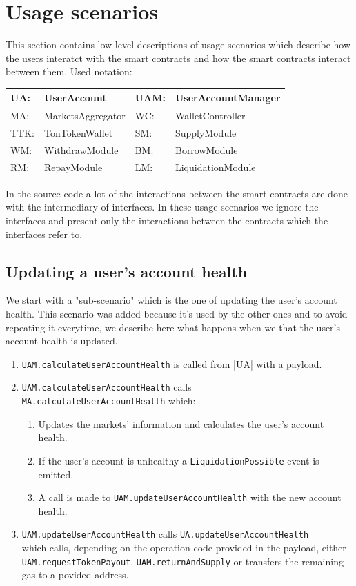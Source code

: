 \section{Usage scenarios}

This section contains low level descriptions of usage scenarios which describe how the users interatct with the smart contracts and how the smart contracts interact between them.
\newpage
Used notation:

\begin{tabularx}{\textwidth}{|l X|l X|} \hline
  UA: & UserAccount &         UAM: & UserAccountManager \\\hline
  MA: & MarketsAggregator &   WC: & WalletController \\\hline
  TTK: & TonTokenWallet &     SM: & SupplyModule \\\hline
  WM: & WithdrawModule &      BM: & BorrowModule \\\hline
  RM: & RepayModule &         LM: & LiquidationModule \\\hline
\end{tabularx}

In the source code a lot of the interactions between the smart contracts are done with the intermediary of interfaces. In these usage scenarios we ignore the interfaces and present only the interactions between the contracts which the interfaces refer to.

\subsection{Updating a user's account health}
We start with a "sub-scenario" which is the one of updating the user's account health. This scenario was added because it's used by the other ones and to avoid repeating it everytime, we describe here what happens when we that the user's account health is updated.

\begin{enumerate}
  \item \verb|UAM.calculateUserAccountHealth| is called from |UA| with a payload.
  \item \verb|UAM.calculateUserAccountHealth| calls \\\verb|MA.calculateUserAccountHealth| which:
  \begin{enumerate}[label*=\arabic*.]
    \item Updates the markets' information and calculates the user's account health.
    \item If the user's account is unhealthy a \verb|LiquidationPossible| event is emitted.
    \item A call is made to \verb|UAM.updateUserAccountHealth| with the new account health.
  \end{enumerate}
  \item \verb|UAM.updateUserAccountHealth| calls \verb|UA.updateUserAccountHealth| \\which calls, depending on the operation code provided in the payload, either \verb|UAM.requestTokenPayout|, \verb|UAM.returnAndSupply| or transfers the remaining gas to a povided address.
\end{enumerate}

